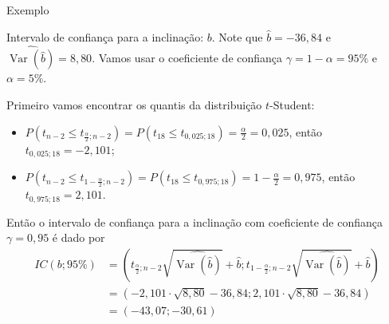 \documentclass[8pt]{beamer}
\DeclareMathOperator{\vari}{Var}
\begin{document}
\begin{frame}{Exemplo}

\begin{block}{Intervalo de confiança para a inclinação: $b$.}
	Note que $\hat{b} = -36,84$ e $\widehat{\vari({\hat{b}})} = 8,80$. Vamos usar o coeficiente de confiança $\gamma = 1 - \alpha = 95\%$ e $\alpha=5\%$.
	
	Primeiro vamos encontrar os quantis da distribuição $t$-Student:
	\begin{itemize}
		\item $P(t_{n-2} \leq t_{\frac{\alpha}{2};n-2}) = P(t_{18} \leq t_{0,025; 18}) = \frac{\alpha}{2} = 0,025$, então $t_{0,025; 18} = -2,101$;
		\item $P(t_{n-2} \leq t_{1-\frac{\alpha}{2};n-2}) = P(t_{18} \leq t_{0,975; 18}) = 1-\frac{\alpha}{2} = 0,975$, então $t_{0,975; 18} = 2,101$.
	\end{itemize}
	Então o intervalo de confiança para a inclinação com coeficiente de confiança $\gamma = 0,95$ é dado por
	\begin{align*}
	IC\left(b;95\%\right) &= \left( t_{\frac{\alpha}{2};n-2} \sqrt{\widehat{\vari({\hat{b}})}} + \hat{b}; t_{1-\frac{\alpha}{2};n-2} \sqrt{\widehat{\vari({\hat{b}})}} + \hat{b} \right)\\
	&= \left( -2,101 \cdot \sqrt{8,80} -36,84; 2,101 \cdot \sqrt{8,80} -36,84 \right)\\
	&=  \left( -43,07; -30,61 \right)
	\end{align*}
\end{block}

\end{frame}
\end{document}
